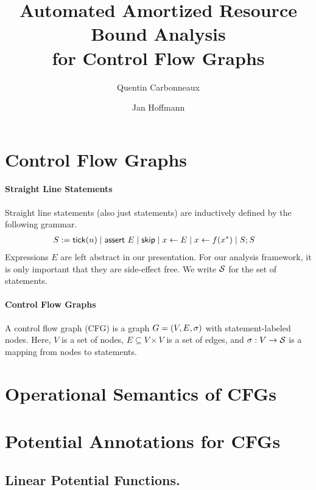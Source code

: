 \documentclass[letterpaper,11pt]{article}
\title{Automated Amortized Resource Bound Analysis \\ for Control Flow Graphs}
\author{Quentin Carbonneaux \and Jan Hoffmann}
\newcommand{\jan}[1]{{\color{blue}{[Jan: #1]}}}
\begin{document}
\maketitle


\section{Control Flow Graphs}

\paragraph{Straight Line Statements}

Straight line statements (also just statements) are inductively
defined by the following grammar.
%
\begin{align*}
S &:= \mathsf{tick}(n) \mid \mathsf{assert}~E
\mid \mathsf{skip}
\mid x \gets E
\mid x \gets f(x^*)
\mid S;S
\end{align*}
%
Expressions $E$ are left abstract in our presentation.  For our
analysis framework, it is only important that they are side-effect
free. We write $\mathcal{S}$ for the set of statements.

\paragraph{Control Flow Graphs}

A control flow graph (CFG) is a graph $G=(V,E,\sigma)$ with
statement-labeled nodes. Here, $V$ is a set of nodes,
$E \subseteq V \times V$ is a set of edges, and
$\sigma : V \to \mathcal{S}$ is a mapping from nodes to statements.

\section{Operational Semantics of CFGs}


\jan{Here we probably need some non-deterministic choice on the
  edges. We have to watch out that this is consistent
  with the assertions that we insert in the blocks. We might have to
  put assertion on the edges to avoid accounting cost for a jump that
  might not happen.}


\section{Potential Annotations for CFGs}

\subsection{Linear Potential Functions.}
\end{document}
